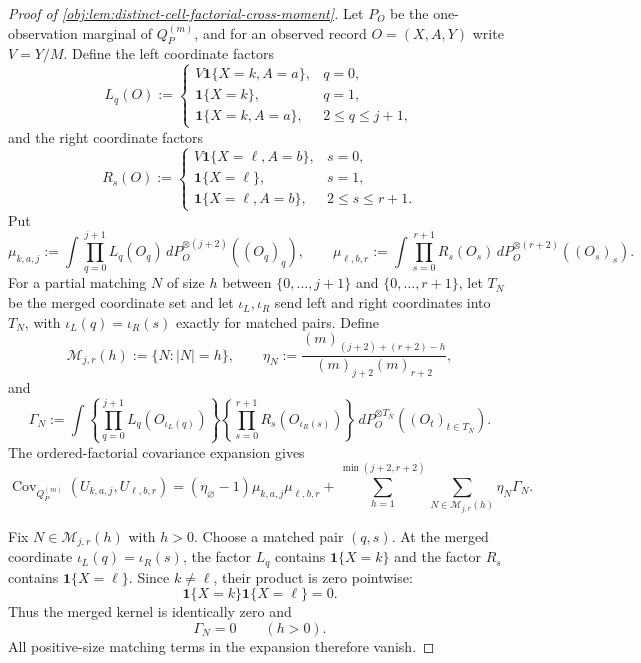 \documentclass[11pt]{article}
\begin{document}
\begin{proof}[Proof of \cref{obj:lem:distinct-cell-factorial-cross-moment}]
Let \(P_O\) be the one-observation marginal of \(Q_P^{(m)}\), and for an observed record \(O=(X,A,Y)\) write \(V=Y/M\).  Define the left coordinate factors
\[
L_q(O):=
\begin{cases}
V\mathbf 1\{X=k,A=a\}, & q=0,\\
\mathbf 1\{X=k\}, & q=1,\\
\mathbf 1\{X=k,A=a\}, & 2\le q\le j+1,
\end{cases}
\]
and the right coordinate factors
\[
R_s(O):=
\begin{cases}
V\mathbf 1\{X=\ell,A=b\}, & s=0,\\
\mathbf 1\{X=\ell\}, & s=1,\\
\mathbf 1\{X=\ell,A=b\}, & 2\le s\le r+1.
\end{cases}
\]
Put
\[
\mu_{k,a,j}:=
\int \prod_{q=0}^{j+1}L_q(O_q)\,
  dP_O^{\otimes(j+2)}((O_q)_q),
\qquad
\mu_{\ell,b,r}:=
\int \prod_{s=0}^{r+1}R_s(O_s)\,
  dP_O^{\otimes(r+2)}((O_s)_s).
\]
For a partial matching \(N\) of size \(h\) between \(\{0,\ldots,j+1\}\) and \(\{0,\ldots,r+1\}\), let \(T_N\) be the merged coordinate set and let \(\iota_L,\iota_R\) send left and right coordinates into \(T_N\), with \(\iota_L(q)=\iota_R(s)\) exactly for matched pairs.  Define
\[
\mathcal M_{j,r}(h):=\{N: |N|=h\},
\qquad
\eta_N:=
\frac{(m)_{(j+2)+(r+2)-h}}{(m)_{j+2}(m)_{r+2}},
\]
and
\[
\Gamma_N:=
\int
\left\{\prod_{q=0}^{j+1}L_q(O_{\iota_L(q)})\right\}
\left\{\prod_{s=0}^{r+1}R_s(O_{\iota_R(s)})\right\}
\,dP_O^{\otimes T_N}((O_t)_{t\in T_N}).
\]
The ordered-factorial covariance expansion gives
\[
\operatorname{Cov}_{Q_P^{(m)}}(U_{k,a,j},U_{\ell,b,r})
=
(\eta_{\varnothing}-1)\mu_{k,a,j}\mu_{\ell,b,r}
+
\sum_{h=1}^{\min(j+2,r+2)}
\sum_{N\in\mathcal M_{j,r}(h)}
\eta_N\Gamma_N .
\]

Fix \(N\in\mathcal M_{j,r}(h)\) with \(h>0\).  Choose a matched pair \((q,s)\).  At the merged coordinate \(\iota_L(q)=\iota_R(s)\), the factor \(L_q\) contains \(\mathbf 1\{X=k\}\) and the factor \(R_s\) contains \(\mathbf 1\{X=\ell\}\).  Since \(k\ne\ell\), their product is zero pointwise:
\[
\mathbf 1\{X=k\}\mathbf 1\{X=\ell\}=0.
\]
Thus the merged kernel is identically zero and
\[
\Gamma_N=0
\qquad (h>0).
\]
All positive-size matching terms in the expansion therefore vanish. %


\end{proof}
\end{document}
